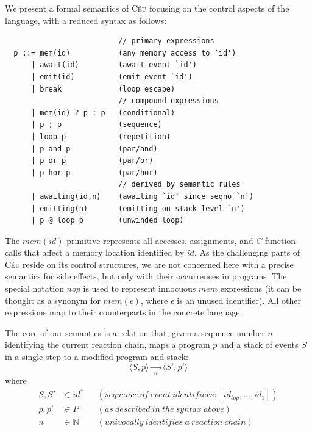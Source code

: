 \documentclass{acm_proc_article-sp}
\newcommand{\CEU}{\textsc{C\'{e}u}\xspace}
\newcommand{\LL}{\langle}
\newcommand{\RR}{\rangle}
\newcommand{\1}{\;}
\newcommand{\2}{\;\;}
\newcommand{\3}{\;\;\;}
\newcommand{\5}{\;\;\;\;\;}
\begin{document}
We present a formal semantics of \CEU focusing on the control aspects of the 
language, with a reduced syntax as follows:
%
{\small
\begin{verbatim}
                          // primary expressions
  p ::= mem(id)           (any memory access to `id')
      | await(id)         (await event `id')
      | emit(id)          (emit event `id')
      | break             (loop escape)
                          // compound expressions
      | mem(id) ? p : p   (conditional)
      | p ; p             (sequence)
      | loop p            (repetition)
      | p and p           (par/and)
      | p or p            (par/or)
      | p hor p           (par/hor)
                          // derived by semantic rules
      | awaiting(id,n)    (awaiting `id' since seqno `n')
      | emitting(n)       (emitting on stack level `n')
      | p @ loop p        (unwinded loop)
\end{verbatim}
}%
%
The $mem(id)$ primitive represents all accesses, assignments, and $C$ function 
calls that affect a memory location identified by $id$.
As the challenging parts of \CEU reside on its control structures, we are not 
concerned here with a precise semantics for side effects, but only with their 
occurrences in programs.
%
The special notation $nop$ is used to represent innocuous $mem$ expressions (it 
can be thought as a synonym for $mem(\epsilon)$, where $\epsilon$ is an unused 
identifier).
%
All other expressions map to their counterparts in the concrete language.

The core of our semantics is a relation that, given a sequence number $n$ 
identifying the current reaction chain, maps a program $p$ and a stack of 
events $S$ in a single step to a modified program and stack:
%
$$
\LL S, p \RR
    \xrightarrow[~~n~~]{}
\LL S', p' \RR
$$
%
where
%
\begin{align*}
S, S' &\in id^*
    &&(sequence~of~event~identifiers: [id_{top}, ..., id_1]) \\
p, p' &\in P
    && (as~described~in~the~syntax~above) \\
n     &\in \mathds{N}
    && (univocally~identifies~a~reaction~chain)
\end{align*}
\end{document}
